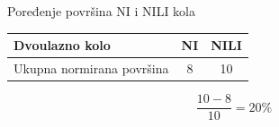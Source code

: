 \begin{frame}[label=09_3-s030]{Poređenje površina NI i NILI kola}
\begin{center}
\begin{tabular}{lcc}\toprule
Dvoulazno kolo & NI & NILI\\\midrule
Ukupna normirana površina & 8 & 10\\\bottomrule
\end{tabular}
\end{center}
\[\frac{10-8}{10}=20\%\]
\end{frame}
